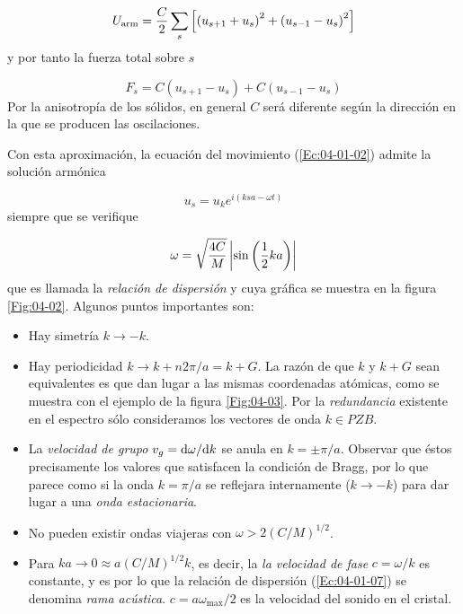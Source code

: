 \begin{equation}
	U_{\text{arm}} = \frac{C}{2} \sum_s \left[ \left( u_{s+1}+u_s \right)^2+\left( u_{s-1}-u_s \right)^2 \right]
\end{equation}
y por tanto la fuerza total sobre $s$ 

\begin{equation}
	F_s = C (u_{s+1}-u_s) + C(u_{s-1}-u_s)
\end{equation}
Por la anisotropía de los sólidos, en general $C$ será diferente según la dirección en la que se producen las oscilaciones. 

Con esta aproximación, la ecuación del movimiento (\ref{Ec:04-01-02}) admite la solución armónica

\begin{equation}
	u_s = u_k e^{i(ksa-\omega t)}
\end{equation}
siempre que se verifique 

\begin{equation}
	\omega = \sqrt{\frac{4C}{M}} \left| \sin \left( \frac{1}{2} k a \right) \right| \label{Ec:04-01-07}
\end{equation}
que es llamada la \textit{relación de dispersión} y cuya gráfica se muestra en la figura \ref{Fig:04-02}. Algunos puntos importantes son:

\begin{itemize}
	\item Hay simetría $k\rightarrow -k$.
	\item Hay periodicidad $k\rightarrow k+n2\pi/a=k+G$. La razón de que $k$ y $k+G$ sean equivalentes es que dan lugar a las mismas coordenadas atómicas, como se muestra con el ejemplo de la figura \ref{Fig:04-03}. Por la \textit{redundancia} existente en el espectro sólo consideramos los vectores de onda $k \in PZB$.
	\item La \textit{velocidad de grupo} $v_g = \mathrm{d}\omega / \mathrm{d} k$ se anula en $k=\pm \pi/a$. Observar que éstos precisamente los valores que satisfacen la condición de Bragg, por lo que parece como si la onda $k=\pi / a$ se reflejara internamente ($k \rightarrow -k$) para dar lugar a una \textit{onda estacionaria}.
	\item No pueden existir ondas viajeras con $\omega>2 (C/M)^{1/2}$.
	\item Para $ka\rightarrow 0 \approx a(C/M)^{1/2}k$, es decir, la \textit{la velocidad de fase} $c=\omega /k$ es constante, y es por lo que la relación de dispersión (\ref{Ec:04-01-07}) se denomina \textit{rama acústica}. $c=a \omega_{\max} /2$ es la velocidad del sonido en el cristal.
\end{itemize}


